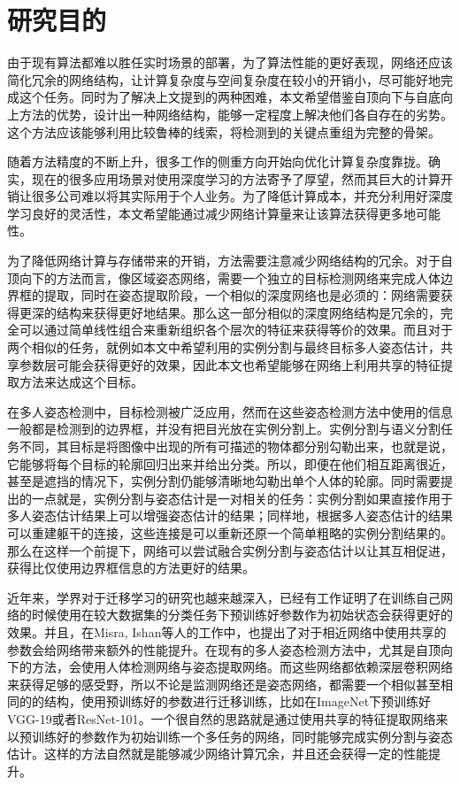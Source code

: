 \section{研究目的}
\label{sec:generalmotivation}
由于现有算法都难以胜任实时场景的部署，为了算法性能的更好表现，网络还应该简化冗余的网络结构，让计算复杂度与空间复杂度在较小的开销小，尽可能好地完成这个任务。同时为了解决上文提到的两种困难，本文希望借鉴自顶向下与自底向上方法的优势，设计出一种网络结构，能够一定程度上解决他们各自存在的劣势。这个方法应该能够利用比较鲁棒的线索，将检测到的关键点重组为完整的骨架。

随着方法精度的不断上升，很多工作的侧重方向开始向优化计算复杂度靠拢。确实，现在的很多应用场景对使用深度学习的方法寄予了厚望，然而其巨大的计算开销让很多公司难以将其实际用于个人业务。为了降低计算成本，并充分利用好深度学习良好的灵活性，本文希望能通过减少网络计算量来让该算法获得更多地可能性。

为了降低网络计算与存储带来的开销，方法需要注意减少网络结构的冗余。对于自顶向下的方法而言，像区域姿态网络\cite{fang2017rmpe}，需要一个独立的目标检测网络来完成人体边界框的提取，同时在姿态提取阶段，一个相似的深度网络也是必须的：网络需要获得更深的结构来获得更好地结果。那么这一部分相似的深度网络结构是冗余的，完全可以通过简单线性组合来重新组织各个层次的特征来获得等价的效果。而且对于两个相似的任务，就例如本文中希望利用的实例分割与最终目标多人姿态估计，共享参数层可能会获得更好的效果，因此本文也希望能够在网络上利用共享的特征提取方法来达成这个目标。

在多人姿态检测中，目标检测被广泛应用，然而在这些姿态检测方法中使用的信息一般都是检测到的边界框，并没有把目光放在实例分割上。实例分割与语义分割任务不同，其目标是将图像中出现的所有可描述的物体都分别勾勒出来，也就是说，它能够将每个目标的轮廓回归出来并给出分类。所以，即便在他们相互距离很近，甚至是遮挡的情况下，实例分割仍能够清晰地勾勒出单个人体的轮廓。同时需要提出的一点就是，实例分割与姿态估计是一对相关的任务：实例分割如果直接作用于多人姿态估计结果上可以增强姿态估计的结果；同样地，根据多人姿态估计的结果可以重建躯干的连接，这些连接是可以重新还原一个简单粗略的实例分割结果的。那么在这样一个前提下，网络可以尝试融合实例分割与姿态估计以让其互相促进，获得比仅使用边界框信息的方法更好的结果。


近年来，学界对于迁移学习的研究也越来越深入，已经有工作证明了在训练自己网络的时候使用在较大数据集的分类任务下预训练好参数作为初始状态会获得更好的效果\cite{mishkin2015all}。并且，在Misra, Ishan等人\cite{misra2016cross}的工作中，也提出了对于相近网络中使用共享的参数会给网络带来额外的性能提升。在现有的多人姿态检测方法中，尤其是自顶向下的方法，会使用人体检测网络与姿态提取网络。而这些网络都依赖深层卷积网络来获得足够的感受野，所以不论是监测网络还是姿态网络，都需要一个相似甚至相同的的结构，使用预训练好的参数进行迁移训练，比如在ImageNet\cite{deng2009imagenet}下预训练好VGG-19\cite{simonyan2014very}或者ResNet-101\cite{He2015Deep}。一个很自然的思路就是通过使用共享的特征提取网络来以预训练好的参数作为初始训练一个多任务的网络，同时能够完成实例分割与姿态估计。这样的方法自然就是能够减少网络计算冗余，并且还会获得一定的性能提升。

